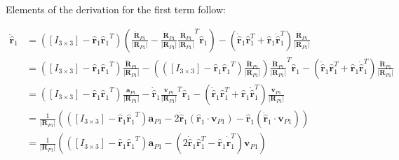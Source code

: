 Elements of the derivation for the first term follow:

\begin{subequations}
	\begin{align}
		\ddot{\hat{\bm{r}}}_1 &= ([I_{3\times3}] - {\hat{\bm{r}}_1}{\hat{\bm{r}}_1}^T) \left(  \frac{\ddot{\bm R}_{P1}}{|{\bm R}_{P1}|} -  \frac{\dot{\bm R}_{P1}}{|{\bm R}_{P1}|}  \frac{\dot{\bm R}_{P1}}{|{\bm R}_{P1}|} ^T \hat{\bm{r}}_1\right)  - \left(\dot{ \hat{\bm{r}}}_1  \hat{\bm{r}}_1^T +  \hat{\bm{r}}_1 \dot{ \hat{\bm{r}}}_1^T\right)\frac{\dot{\bm R}_{P1}}{|{\bm R}_{P1}|}  \\
		&= ([I_{3\times3}] - {\hat{\bm{r}}_1}{\hat{\bm{r}}_1}^T) \frac{\ddot{\bm R}_{P1}}{|{\bm R}_{P1}|} - \left( ([I_{3\times3}] - {\hat{\bm{r}}_1}{\hat{\bm{r}}_1}^T) \frac{\dot{\bm R}_{P1}}{|{\bm R}_{P1}|} \right) \frac{\dot{\bm R}_{P1}}{|{\bm R}_{P1}|} ^T \hat{\bm{r}}_1  - \left(\dot{ \hat{\bm{r}}}_1  \hat{\bm{r}}_1^T +  \hat{\bm{r}}_1 \dot{ \hat{\bm{r}}}_1^T\right)\frac{\dot{\bm R}_{P1}}{|{\bm R}_{P1}|}  \\
		&= ([I_{3\times3}] - {\hat{\bm{r}}_1}{\hat{\bm{r}}_1}^T) \frac{{\bm a}_{P1}}{|{\bm R}_{P1}|} - \dot{ \hat{\bm{r}}}_1 \frac{{\bm v}_{P1}}{|{\bm R}_{P1}|} ^T \hat{\bm{r}}_1  - \left(\dot{ \hat{\bm{r}}}_1  \hat{\bm{r}}_1^T +  \hat{\bm{r}}_1 \dot{ \hat{\bm{r}}}_1^T\right)\frac{{\bm v}_{P1}}{|{\bm R}_{P1}|}  \\
		&= \frac{1}{|{\bm R}_{P1}|}(([I_{3\times3}] - {\hat{\bm{r}}_1}{\hat{\bm{r}}_1}^T)  \bm{a}_{P1} - 2\dot{\hat{\bm{r}}}_1 (\hat{\bm{r}}_1 \cdot \bm{v}_{P1}) - \hat{\bm{r}}_1 (\dot{\hat{\bm{r}}}_1 \cdot \bm{v}_{P1}) ) \\
		&= \frac{1}{|{\bm R}_{P1}|}\left(([I_{3\times3}] - {\hat{\bm{r}}_1}{\hat{\bm{r}}_1}^T)  \bm{a}_{P1} - \left(2\dot{\hat{\bm{r}}}_1 \hat{\bm{r}}_1^T  - \hat{\bm{r}}_1 \dot{\hat{\bm{r}}}_1^T \right)  \bm{v}_{P1} \right)
	\end{align}
\end{subequations}



